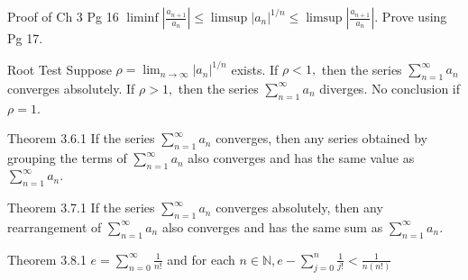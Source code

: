 \documentclass[10pt,landscape]{article}
\theoremstyle{definition}
\newcommand{\thistheoremname}{}
\newtheorem*{genericthm*}{\thistheoremname}
\newenvironment{namedthm*}[1]
{\renewcommand{\thistheoremname}{#1}\begin{genericthm*}}
{\end{genericthm*}}
\begin{document}
\begin{multicols}{3}

	\begin{namedthm*}{Proof of Ch 3 Pg 16}
		\(\liminf \left|\frac{a_{n+1}}{a_{n}}\right| \leq \limsup \left|a_{n}\right|^{1 / n} \leq \limsup \left|\frac{a_{n+1}}{a_{n}}\right|\). Prove using Pg 17.
	\end{namedthm*}

	\begin{namedthm*}{Root Test}
		Suppose \(\rho=\lim _{n \rightarrow \infty}\left|a_{n}\right|^{1 / n}\) exists. If \(\rho<1,\) then the series \(\sum_{n=1}^{\infty} a_{n}\) converges absolutely. If \(\rho>1,\) then the series \(\sum_{n=1}^{\infty} a_{n}\) diverges. No conclusion if \(\rho = 1\).
	\end{namedthm*}

	\begin{namedthm*}{Theorem 3.6.1}
		If the series \(\sum_{n=1}^{\infty} a_{n}\) converges, then any series obtained by grouping the
		terms of \(\sum_{n=1}^{\infty} a_{n}\) also converges and has the same value as \(\sum_{n=1}^{\infty} a_{n} .\)
	\end{namedthm*}

	\begin{namedthm*}{Theorem 3.7.1}
		If the series \(\sum_{n=1}^{\infty} a_{n}\) converges absolutely, then any rearrangement of \(\sum_{n=1}^{\infty} a_{n}\) also converges and has the same sum as \(\sum_{n=1}^{\infty} a_{n} .\)
	\end{namedthm*}

	\begin{namedthm*}{Theorem 3.8.1}
		\(e=\sum_{n=0}^{\infty} \frac{1}{n !}\) and for each \(n \in \mathbb{N}, e-\sum_{j=0}^{n}\frac{1}{j !}<\frac{1}{n(n !)}\)
	\end{namedthm*}


\end{multicols}
\end{document}
